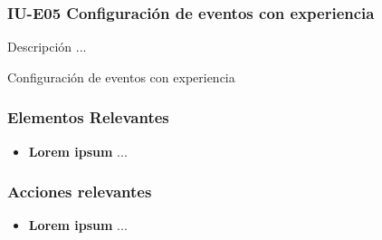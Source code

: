 
\subsubsection{IU-E05 Configuración de eventos con experiencia}

 Descripción ...

        {Configuración de eventos con experiencia}

\subsubsection{Elementos Relevantes}

    \begin{itemize}
    \item {\bf Lorem ipsum}
        ...
    \end{itemize}

\subsubsection{Acciones relevantes}

    \begin{itemize}
    \item {\bf Lorem ipsum}
        ...
    \end{itemize}

\clearpage
